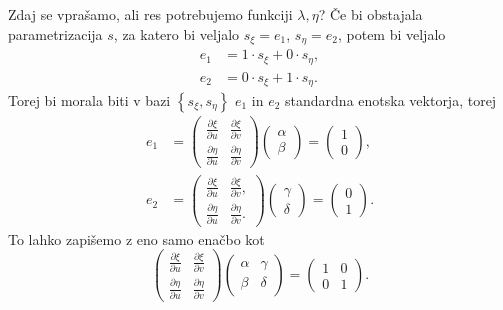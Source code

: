 Zdaj se vprašamo, ali res potrebujemo funkciji $\lambda, \eta$? Če bi obstajala parametrizacija $s$, za katero bi veljalo $s_{\xi} = e_1$, $s_{\eta} = e_2$, potem bi veljalo 
\begin{align*}
    e_1 &= 1 \cdot s_{\xi} + 0 \cdot s_{\eta},  \\
    e_2 &= 0 \cdot s_{\xi} + 1 \cdot s_{\eta}.
\end{align*}
Torej bi morala biti v bazi $\left\{ s_{\xi}, s_{\eta} \right\}$ $e_1$ in $e_2$ standardna enotska vektorja, torej
\begin{align*}
  e_1 &=  \begin{pmatrix}
  \frac{ \partial \xi }{ \partial u }  & \frac{ \partial \xi }{ \partial v }  \\
  \frac{ \partial \eta }{ \partial u }  & \frac{ \partial \eta }{ \partial v } 
  \end{pmatrix} \begin{pmatrix}
  \alpha \\ \beta 
  \end{pmatrix}  = \begin{pmatrix}
    1 \\ 0 
    \end{pmatrix},   \\
  e_2 &= \begin{pmatrix}
    \frac{ \partial \xi }{ \partial u }  & \frac{ \partial \xi }{ \partial v },  \\
    \frac{ \partial \eta }{ \partial u }  & \frac{ \partial \eta }{ \partial v }.
    \end{pmatrix} \begin{pmatrix}
    \gamma \\ \delta 
    \end{pmatrix}  = \begin{pmatrix}
      0 \\ 1 
      \end{pmatrix}.
\end{align*}
To lahko zapišemo z eno samo enačbo kot \begin{equation*}
  \begin{pmatrix}
    \frac{ \partial \xi }{ \partial u }  & \frac{ \partial \xi }{ \partial v }  \\
    \frac{ \partial \eta }{ \partial u }  & \frac{ \partial \eta }{ \partial v } 
    \end{pmatrix} \begin{pmatrix}
      \alpha & \gamma \\ \beta & \delta
      \end{pmatrix} = \begin{pmatrix}
        1 & 0  \\ 0 & 1 
        \end{pmatrix}.
\end{equation*}  
